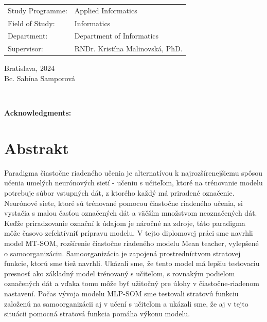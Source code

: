 \documentclass[12pt, twoside]{book}
\def\mfrok{2024}
\def\mfautor{Bc. Sabína Samporová}
\def\mfskolitel{RNDr. Kristína Malinovská, PhD.}
\def\mfkonzultant{tit. Meno Priezvisko, tit. }
\def\mfmiesto{Bratislava, \mfrok}
\def\mfodbor{Informatics}
\def\program{Applied Informatics}
\def\mfpracovisko{ Department of Informatics}
\begin{document}
\vfill

\noindent
\begin{tabular}{ll}
Study Programme: & \program \\
Field of Study: & \mfodbor \\
Department: & \mfpracovisko \\
Supervisor: & \mfskolitel \\
\end{tabular}

\vfill


\noindent \mfmiesto\\
\mfautor

\cleardoublepage



\newpage
\setcounter{page}{2}






\newpage
\pagestyle{plain}
~

\vfill
{\bf Acknowledgments:} %



\newpage 
\section*{Abstrakt}

Paradigma čiastočne riadeného učenia je alternatívou k najrozšírenejšiemu spôsou učenia umelých neurónových sietí - učeniu s učiteľom, ktoré na trénovanie modelu potrebuje súbor vstupných dát, z ktorého každý má priradené označenie. Neurónové siete, ktoré sú trénované pomocou čiastočne riadeného učenia, si vystačia s malou časťou označených dát a väčším množstvom neoznačených dát. Keďže priradzovanie označní k údajom je náročné na zdroje, táto paradigma môže časovo zefektívniť prípravu modelu.
V tejto diplomovej práci sme navrhli model MT-SOM, rozšírenie čiastočne riadeného modelu Mean teacher, vylepšené o samoorganizáciu. Samoorganizácia je zapojená prostredníctvom stratovej funkcie, ktorú sme tiež navrhli. Ukázali sme, že tento model má lepšiu testovaciu presnosť ako základný model trénovaný s učiteľom, s rovnakým podielom označených dát a vďaka tomu môže byť užitočný pre úlohy v čiastočne-riadenom nastavení. Počas vývoja modelu MLP-SOM sme testovali stratovú funkciu založenú na samoorganizácii aj v učení s učiteľom a ukázali sme, že aj v tejto situácii pomocná stratová funkcia pomáha výkonu modelu.
\end{document}
